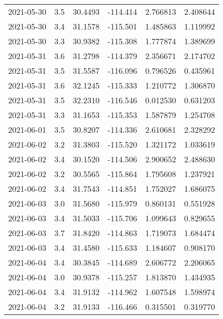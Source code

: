 \begin{tabular}{lrrrrr}
2021-05-30 &       3.5 &  30.4493 &  -114.414 &         2.766813 &         2.408644 \\
2021-05-30 &       3.4 &  31.1578 &  -115.501 &         1.485863 &         1.119992 \\
2021-05-30 &       3.3 &  30.9382 &  -115.308 &         1.777874 &         1.389699 \\
2021-05-31 &       3.6 &  31.2798 &  -114.379 &         2.356671 &         2.174702 \\
2021-05-31 &       3.5 &  31.5587 &  -116.096 &         0.796526 &         0.435961 \\
2021-05-31 &       3.6 &  32.1245 &  -115.333 &         1.210772 &         1.306870 \\
2021-05-31 &       3.5 &  32.2310 &  -116.546 &         0.012530 &         0.631203 \\
2021-05-31 &       3.3 &  31.1653 &  -115.353 &         1.587879 &         1.254708 \\
2021-06-01 &       3.5 &  30.8207 &  -114.336 &         2.610681 &         2.328292 \\
2021-06-02 &       3.2 &  31.3803 &  -115.520 &         1.321172 &         1.033619 \\
2021-06-02 &       3.4 &  30.1520 &  -114.506 &         2.900652 &         2.488630 \\
2021-06-02 &       3.2 &  30.5565 &  -115.864 &         1.795608 &         1.237921 \\
2021-06-02 &       3.4 &  31.7543 &  -114.851 &         1.752027 &         1.686075 \\
2021-06-03 &       3.0 &  31.5680 &  -115.979 &         0.860131 &         0.551928 \\
2021-06-03 &       3.4 &  31.5033 &  -115.706 &         1.099643 &         0.829655 \\
2021-06-03 &       3.7 &  31.8420 &  -114.863 &         1.719073 &         1.684474 \\
2021-06-03 &       3.4 &  31.4580 &  -115.633 &         1.184607 &         0.908170 \\
2021-06-04 &       3.4 &  30.3845 &  -114.689 &         2.606772 &         2.206065 \\
2021-06-04 &       3.0 &  30.9378 &  -115.257 &         1.813870 &         1.434935 \\
2021-06-04 &       3.4 &  31.9132 &  -114.962 &         1.607548 &         1.598974 \\
2021-06-04 &       3.2 &  31.9133 &  -116.466 &         0.315501 &         0.319770 \\

\end{tabular}
